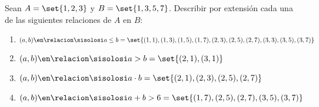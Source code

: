\ejercicio Sean $A = \set{1, 2, 3}$ y $B = \set{1, 3, 5, 7}$. Describir por extensión cada una de las
siguientes relaciones de $A$ en $B$:
\begin{enumerate}[label=\roman*)]
	\item $(a,b) \en \relacion \sisolosi a\leq b =\\
		      \set{(1,1), (1,3), (1,5), (1,7), (2,3), (2,5), (2,7), (3,3), (3,5), (3,7)}$

	\item $(a,b) \en \relacion \sisolosi a > b = \set{(2,1), (3, 1)}$

	\item $(a,b) \en \relacion \sisolosi a \cdot b = \set{(2,1), (2,3), (2,5), (2,7)}$

	\item $(a,b) \en \relacion \sisolosi a + b > 6 = \set{(1,7), (2,5), (2, 7), (3, 5), (3, 7)}$
\end{enumerate}
